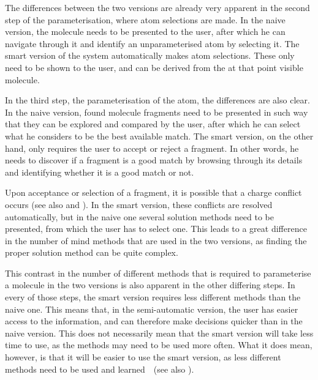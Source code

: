 The differences between the two versions are already very apparent in the second step of the parameterisation, where atom selections are made. In the naive version, the molecule needs to be presented to the user, after which he can navigate through it and identify an unparameterised atom by selecting it. The smart version of the system automatically makes atom selections. These only need to be shown to the user, and can be derived from the at that point visible molecule.

In the third step, the parameterisation of the atom, the differences are also clear. In the naive version, found molecule fragments need to be presented in such way that they can be explored and compared by the user, after which he can select what he considers to be the best available match. The smart version, on the other hand, only requires the user to accept or reject a fragment. In other words, he needs to discover if a fragment is a good match by browsing through its details and identifying whether it is a good match or not.

Upon acceptance or selection of a fragment, it is possible that a charge conflict occurs (see also  and ). In the smart version, these conflicts are resolved automatically, but in the naive one several solution methods need to be presented, from which the user has to select one. This leads to a great difference in the number of mind methods that are used in the two versions, as finding the proper solution method can be quite complex.

This contrast in the number of different methods that is required to parameterise a molecule in the two versions is also apparent in the other differing steps. In every of those steps, the smart version requires less different methods than the naive one. This means that, in the semi-automatic version, the user has easier access to the information, and can therefore make decisions quicker than in the naive version. This does not necessarily mean that the smart version will take less time to use, as the methods may need to be used more often. What it does mean, however, is that it will be easier to use the smart version, as less different methods need to be used and learned~\cite{sweller1994cognitive}~(see also ).
